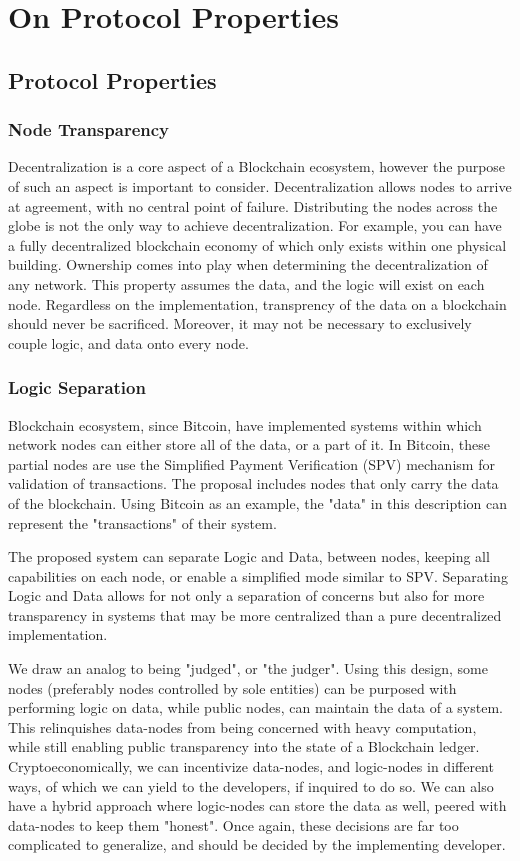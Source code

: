 \documentclass[12pt, titlepage, twocolumn]{report}
\begin{document}
\chapter{On Protocol Properties}
 
\section{Protocol Properties}

\subsection{Node Transparency}
Decentralization is a core aspect of a Blockchain ecosystem, however the purpose of such an aspect is important to consider. Decentralization allows nodes to arrive at agreement, with no central point of failure. Distributing the nodes across the globe is not the only way to achieve decentralization. For example, you can have a fully decentralized blockchain economy of which only exists within one physical building. Ownership comes into play when determining the decentralization of any network. This property assumes the data, and the logic will exist on each node. Regardless on the implementation, transprency of the data on a blockchain should never be sacrificed. Moreover, it may not be necessary to exclusively couple logic, and data onto every node.



\subsection{Logic Separation} \label{logicsep}
Blockchain ecosystem, since Bitcoin, have implemented systems within which network nodes can either store all of the data, or a part of it. In Bitcoin, these partial nodes are use the Simplified Payment Verification (SPV) mechanism for validation of transactions. The proposal includes nodes that only carry the data of the blockchain. Using Bitcoin as an example, the "data" in this description can represent the "transactions" of their system. 

The proposed system can separate Logic and Data, between nodes, keeping all capabilities on each node, or enable a simplified mode similar to SPV. Separating Logic and Data allows for not only a separation of concerns but also for more transparency in systems that may be more centralized than a pure decentralized implementation.

We draw an analog to being "judged", or "the judger". Using this design, some nodes (preferably nodes controlled by sole entities) can be purposed with performing logic on data, while public nodes, can maintain the data of a system. This relinquishes data-nodes from being concerned with heavy computation, while still enabling public transparency into the state of a Blockchain ledger. Cryptoeconomically, we can incentivize data-nodes, and logic-nodes in different ways, of which we can yield to the developers, if inquired to do so. We can also have a hybrid approach where logic-nodes can store the data as well, peered with data-nodes to keep them "honest". Once again, these decisions are far too complicated to generalize, and should be decided by the implementing developer.
\end{document}
